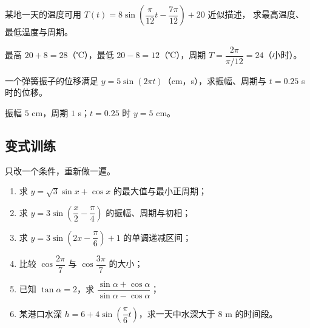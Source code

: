 \begin{explore}
\begin{example}
某地一天的温度可用 $T(t)=8\sin\left(\dfrac{\pi}{12}t-\dfrac{7\pi}{12}\right)+20$ 近似描述，
求最高温度、最低温度与周期。
\end{example}
\begin{solution}
最高 $20+8=28$（℃），最低 $20-8=12$（℃），周期 $T=\dfrac{2\pi}{\pi/12}=24$（小时）。
\end{solution}

\begin{problem}
一个弹簧振子的位移满足 $y=5\sin(2\pi t)$（cm，s），求振幅、周期与 $t=0.25$ s 时的位移。
\end{problem}
\begin{solution}
振幅 $5$ cm，周期 $1$ s；$t=0.25$ 时 $y=5$ cm。
\end{solution}
\end{explore}

\begin{inclasstest}
\subsection{变式训练}
只改一个条件，重新做一遍。
\begin{enumerate}
  \item 求 $y=\sqrt3\sin x+\cos x$ 的最大值与最小正周期；
  \item 求 $y=3\sin\left(\dfrac{x}{2}-\dfrac{\pi}{4}\right)$ 的振幅、周期与初相；
  \item 求 $y=3\sin\left(2x-\dfrac{\pi}{6}\right)+1$ 的单调递减区间；
  \item 比较 $\cos\dfrac{2\pi}{7}$ 与 $\cos\dfrac{3\pi}{7}$ 的大小；
  \item 已知 $\tan\alpha=2$，求 $\dfrac{\sin\alpha+\cos\alpha}{\sin\alpha-\cos\alpha}$；
  \item 某港口水深 $h=6+4\sin\left(\dfrac{\pi}{6}t\right)$，求一天中水深大于 $8$ m 的时间段。
\end{enumerate}
\end{inclasstest}

